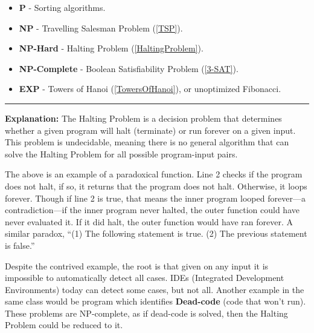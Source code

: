 \newpage

\begin{Example}

    \begin{itemize}
        \item \textbf{P} - Sorting algorithms.
        \item \textbf{NP} - Travelling Salesman Problem (\ref{TSP}).
        \item \textbf{NP-Hard} - Halting Problem (\ref{HaltingProblem}).
        \item \textbf{NP-Complete} - Boolean Satisfiability Problem (\ref{3-SAT}).
        \item \textbf{EXP} - Towers of Hanoi (\ref{TowersOfHanoi}), or unoptimized Fibonacci.
    \end{itemize}
\end{Example}

\begin{Func}

    \label{HaltingProblem}
    \vspace{-.5em}
    \begin{algorithm}[H]
        \SetAlgoLined
         
    \end{algorithm}
    \noindent
    \rule{\textwidth}{0.4pt}
    \textbf{Explanation:} The Halting Problem is a decision problem that determines whether a given program will halt (terminate) or run forever on a given input. 
    This problem is undecidable, meaning there is no general algorithm that can solve the Halting Problem for all possible program-input pairs. 

    The above is an example of a paradoxical function. Line 2 checks if the program does not halt, if so, it returns that the program does not halt.
    Otherwise, it loops forever. Though if line 2 is true, that means the inner program looped forever---a contradiction---if the inner program never halted, the outer function could have never evaluated it.
    If it did halt, the outer function would have ran forever. A similar paradox, ``(1) The following statement is true. (2) The previous statement is false.''

    Despite the contrived example, the root is that given on any input it is impossible to automatically detect all cases. IDEs (Integrated Development Environments) today can detect some cases, but not all.
    Another example in the same class would be program which identifies \textbf{Dead-code} (code that won't run). These problems are NP-complete, as if dead-code is solved, then the Halting Problem could be reduced 
    to it.
\end{Func}

